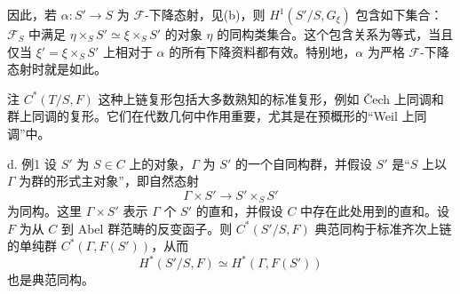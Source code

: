 因此，若 $\alpha:S'\to S$ 为 $\mathcal F$-下降态射，见(b)，则 $H^1(S'/S,G_\xi)$ 包含如下集合：$\mathcal F_S$ 中满足 $\eta\times_SS'\simeq\xi\times_SS'$ 的对象 $\eta$ 的同构类集合。这个包含关系为等式，当且仅当 $\xi'=\xi\times_SS'$ 上相对于 $\alpha$ 的所有下降资料都有效。特别地，$\alpha$ 为严格 $\mathcal F$-下降态射时就是如此。
\begin{statement}{注}
$C^*(T/S,F)$ 这种上链复形包括大多数熟知的标准复形，例如 Čech 上同调和群上同调的复形。它们在代数几何中作用重要，尤其是在预概形的“Weil 上同调”中。
\end{statement}
\begin{statement}{d. 例1}
设 $S'$ 为 $S\in C$ 上的对象，$\Gamma$ 为 $S'$ 的一个自同构群，并假设 $S'$ 是“$S$ 上以 $\Gamma$ 为群的形式主对象”，即自然态射
\[
\Gamma\times S'\longrightarrow S'\times_SS'
\]
为同构。这里 $\Gamma\times S'$ 表示 $\Gamma$ 个 $S'$ 的直和，并假设 $C$ 中存在此处用到的直和。设 $F$ 为从 $C$ 到 Abel 群范畴的反变函子。则 $C^*(S'/S,F)$ 典范同构于标准齐次上链的单纯群 $C^*(\Gamma,F(S'))$，从而
\[
H^*(S'/S,F)\simeq H^*(\Gamma,F(S'))
\]
也是典范同构。
\end{statement}

